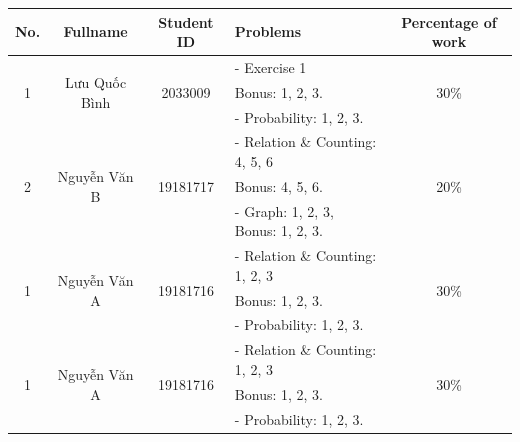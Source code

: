 \documentclass[a4paper]{article}
\begin{document}
    \begin{center}
        \begin{tabular}{|c|c|c|l|c|}
            \hline
            \textbf{No.}       & \textbf{Fullname}              & \textbf{Student ID}       & \textbf{Problems}                 & \textbf{Percentage of work} \\
            \hline
            \multirow{3}{*}{1} & \multirow{3}{*}{Lưu Quốc Bình} & \multirow{3}{*}{2033009}  & - Exercise 1 & \multirow{3}{*}{30\%}\\
            &                                &                           & Bonus: 1, 2, 3.                   &                             \\
            &                                &                           & - Probability: 1, 2, 3.           &                             \\
            \hline
            \multirow{3}{*}{2} & \multirow{3}{*}{Nguyễn Văn B}  & \multirow{3}{*}{19181717} & - Relation \& Counting: 4, 5, 6& \multirow{3}{*}{20\%}\\
            &                                &                           & Bonus: 4, 5, 6.                   &                             \\
            &                                &                           & - Graph: 1, 2, 3, Bonus: 1, 2, 3. &                             \\
            \hline
            \multirow{3}{*}{1} & \multirow{3}{*}{Nguyễn Văn A}  & \multirow{3}{*}{19181716} & - Relation \& Counting: 1, 2, 3& \multirow{3}{*}{30\%}\\
            &                                &                           & Bonus: 1, 2, 3.                   &                             \\
            &                                &                           & - Probability: 1, 2, 3.           &                             \\
            \hline
            \multirow{3}{*}{1} & \multirow{3}{*}{Nguyễn Văn A}  & \multirow{3}{*}{19181716} & - Relation \& Counting: 1, 2, 3& \multirow{3}{*}{30\%}\\
            &                                &                           & Bonus: 1, 2, 3.                   &                             \\
            &                                &                           & - Probability: 1, 2, 3.           &                             \\
            \hline
        \end{tabular}
    \end{center}
\end{document}
